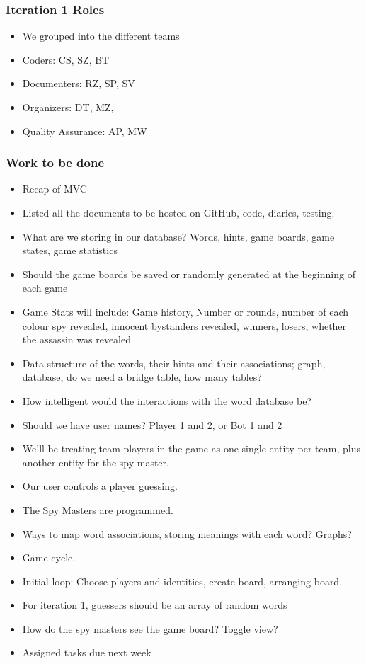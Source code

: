 \documentclass[12pt]{article}
\begin{document}
		\subsubsection{Iteration 1 Roles}
			\begin{itemize}
			\item We grouped into the different teams
			\item Coders: CS, SZ, BT
			\item Documenters: RZ, SP, SV
			\item Organizers: DT, MZ, 
			\item Quality Assurance: AP, MW 
			\end{itemize}

		\subsubsection{Work to be done }
			\begin{itemize}
			\item Recap of MVC 
			\item Listed all the documents to be hosted on GitHub, code, diaries, testing.
			\item What are we storing in our database? Words, hints, game boards, game states, game statistics 
			\item Should the game boards be saved or randomly generated at the beginning of each game
			\item Game Stats will include: Game history, Number or rounds, number of each colour spy revealed, innocent bystanders revealed, winners, losers, whether the assassin was revealed 
			\item Data structure of the words, their hints and their associations; graph, database, do we need a bridge table, how many tables?
			\item How intelligent would the interactions with the word database be?
			\item Should we have user names? Player 1 and 2, or Bot 1 and 2
			\item We’ll be treating team players in the game as one single entity per team, plus another entity for the spy master.
			\item Our user controls a player guessing.
			\item The Spy Masters are programmed. 
			\item Ways to map word associations, storing meanings with each word? Graphs?
			\item Game cycle. 
			\item Initial loop: Choose players and identities, create board, arranging board.
			\item For iteration 1, guessers should be an array of random words 
			\item How do the spy masters see the game board? Toggle view?
			\item Assigned tasks due next week 
			
			\end{itemize}
	
\end{document}
